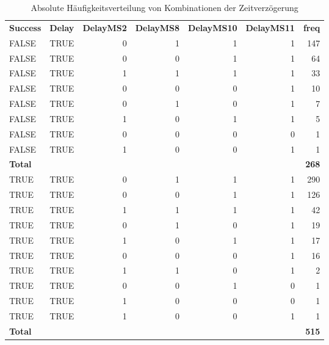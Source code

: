 \begin{table}[H]
	\centering
	\caption{Absolute Häufigkeitsverteilung von Kombinationen der Zeitverzögerung}
	\begin{tabular}{lrrrrrr}
		\textbf{Success} & \multicolumn{1}{l}{\textbf{Delay}} & \multicolumn{1}{l}{\textbf{DelayMS2}} & \multicolumn{1}{l}{\textbf{DelayMS8}} & \multicolumn{1}{l}{\textbf{DelayMS10}} & \multicolumn{1}{l}{\textbf{DelayMS11}} & \multicolumn{1}{l}{\textbf{freq}} \\
		FALSE & \multicolumn{1}{l}{TRUE} & 0     & 1     & 1     & 1     & 147 \\
		FALSE & \multicolumn{1}{l}{TRUE} & 0     & 0     & 1     & 1     & 64 \\
		FALSE & \multicolumn{1}{l}{TRUE} & 1     & 1     & 1     & 1     & 33 \\
		FALSE & \multicolumn{1}{l}{TRUE} & 0     & 0     & 0     & 1     & 10 \\
		FALSE & \multicolumn{1}{l}{TRUE} & 0     & 1     & 0     & 1     & 7 \\
		FALSE & \multicolumn{1}{l}{TRUE} & 1     & 0     & 1     & 1     & 5 \\
		FALSE & \multicolumn{1}{l}{TRUE} & 0     & 0     & 0     & 0     & 1 \\
		FALSE & \multicolumn{1}{l}{TRUE} & 1     & 0     & 0     & 1     & 1 \\\hline
		\textbf{Total} &       &       &       &       &       & \textbf{268} \\
		TRUE  & \multicolumn{1}{l}{TRUE} & 0     & 1     & 1     & 1     & 290 \\
		TRUE  & \multicolumn{1}{l}{TRUE} & 0     & 0     & 1     & 1     & 126 \\
		TRUE  & \multicolumn{1}{l}{TRUE} & 1     & 1     & 1     & 1     & 42 \\
		TRUE  & \multicolumn{1}{l}{TRUE} & 0     & 1     & 0     & 1     & 19 \\
		TRUE  & \multicolumn{1}{l}{TRUE} & 1     & 0     & 1     & 1     & 17 \\
		TRUE  & \multicolumn{1}{l}{TRUE} & 0     & 0     & 0     & 1     & 16 \\
		TRUE  & \multicolumn{1}{l}{TRUE} & 1     & 1     & 0     & 1     & 2 \\
		TRUE  & \multicolumn{1}{l}{TRUE} & 0     & 0     & 1     & 0     & 1 \\
		TRUE  & \multicolumn{1}{l}{TRUE} & 1     & 0     & 0     & 0     & 1 \\
		TRUE  & \multicolumn{1}{l}{TRUE} & 1     & 0     & 0     & 1     & 1 \\\hline
		\textbf{Total} &       &       &       &       &       & \textbf{515} \\
	\end{tabular}%
	\label{fdleay}%
\end{table}%
